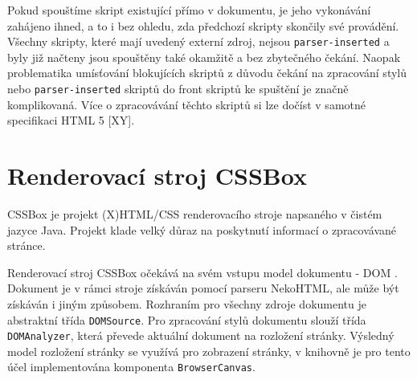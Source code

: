 Pokud spouštíme skript existující přímo v dokumentu, je jeho vykonávání zahájeno ihned, a to i bez ohledu, zda předchozí skripty skončily své provádění. Všechny skripty, které mají uvedený externí zdroj, nejsou \texttt{parser-inserted} a byly již načteny jsou spouštěny také okamžitě a bez zbytečného čekání. Naopak problematika umísťování blokujících skriptů z důvodu čekání na zpracování stylů nebo \texttt{parser-inserted} skriptů do front skriptů ke spuštění je značně komplikovaná. Více o zpracovávání těchto skriptů si lze dočíst v samotné specifikaci HTML 5 [XY].

\section{Renderovací stroj CSSBox}
\label{Chapter.DependenciesAnalysis.CSSBox}

CSSBox je projekt (X)HTML/CSS renderovacího stroje napsaného v čistém jazyce Java. Projekt klade velký důraz na poskytnutí informací o zpracovávané stránce.

Renderovací stroj CSSBox očekává na svém vstupu model dokumentu - DOM . Dokument je v rámci stroje získáván pomocí parseru NekoHTML, ale může být získáván i jiným způsobem. Rozhraním pro všechny zdroje dokumentu je abstraktní třída \texttt{DOMSource}. Pro zpracování stylů dokumentu slouží třída \texttt{DOMAnalyzer}, která převede aktuální dokument na rozložení stránky. Výsledný model rozložení stránky se využívá pro zobrazení stránky, v knihovně je pro tento účel implementována komponenta \texttt{BrowserCanvas}.

